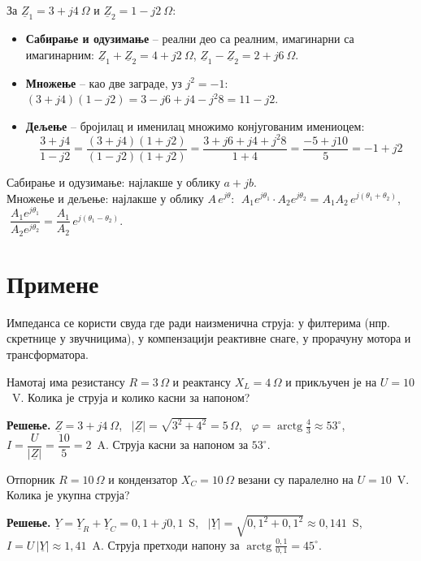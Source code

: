 \documentclass{article}
\begin{document}
За $\underline{Z}_1 = 3 + j4\ \Omega$ и $\underline{Z}_2 = 1 - j2\ \Omega$:

\begin{itemize}
    \item \textbf{Сабирање и одузимање} -- реални део са реалним, имагинарни са
          имагинарним:
          $\underline{Z}_1 + \underline{Z}_2 = 4 + j2\ \Omega$, \quad
          $\underline{Z}_1 - \underline{Z}_2 = 2 + j6\ \Omega$.
    \item \textbf{Множење} -- као две заграде, уз $j^2 = -1$:
          $(3 + j4)(1 - j2) = 3 - j6 + j4 - j^2 8 = 11 - j2$.
    \item \textbf{Дељење} -- бројилац и именилац множимо конјугованим имениоцем:
          \[
          \frac{3 + j4}{1 - j2} = \frac{(3 + j4)(1 + j2)}{(1 - j2)(1 + j2)}
          = \frac{3 + j6 + j4 + j^2 8}{1 + 4} = \frac{-5 + j10}{5} = -1 + j2
          \]
\end{itemize}

\begin{kljucno}
Сабирање и одузимање: најлакше у облику $a + jb$. \\
Множење и дељење: најлакше у облику $A\,e^{j\theta}$:
$\;A_1 e^{j\theta_1}\cdot A_2 e^{j\theta_2} = A_1 A_2\, e^{j(\theta_1 + \theta_2)}$,
$\;\dfrac{A_1 e^{j\theta_1}}{A_2 e^{j\theta_2}} = \dfrac{A_1}{A_2}\, e^{j(\theta_1 - \theta_2)}$.
\end{kljucno}

\section{Примене}

Импеданса се користи свуда где ради наизменична струја: у филтерима (нпр.
скретнице у звучницима), у компензацији реактивне снаге, у прорачуну мотора и
трансформатора.

\begin{primer}
Намотај има резистансу $R = 3\,\Omega$ и реактансу $X_L = 4\,\Omega$ и прикључен
је на $U = 10$~V. Колика је струја и колико касни за напоном?

\textbf{Решење.}
$\underline{Z} = 3 + j4\ \Omega$, \
$|\underline{Z}| = \sqrt{3^2 + 4^2} = 5\,\Omega$, \
$\varphi = \operatorname{arctg}\frac{4}{3} \approx 53^\circ$, \
$I = \dfrac{U}{|\underline{Z}|} = \dfrac{10}{5} = 2$~A.
Струја касни за напоном за $53^\circ$.
\end{primer}

\begin{primer}
Отпорник $R = 10\,\Omega$ и кондензатор $X_C = 10\,\Omega$ везани су
паралелно на $U = 10$~V. Колика је укупна струја?

\textbf{Решење.}
$\underline{Y} = \underline{Y}_R + \underline{Y}_C = 0{,}1 + j0{,}1$~S, \
$|\underline{Y}| = \sqrt{0{,}1^2 + 0{,}1^2} \approx 0{,}141$~S, \
$I = U\,|\underline{Y}| \approx 1{,}41$~A.
Струја претходи напону за $\operatorname{arctg}\frac{0{,}1}{0{,}1} = 45^\circ$.
\end{primer}
\end{document}
